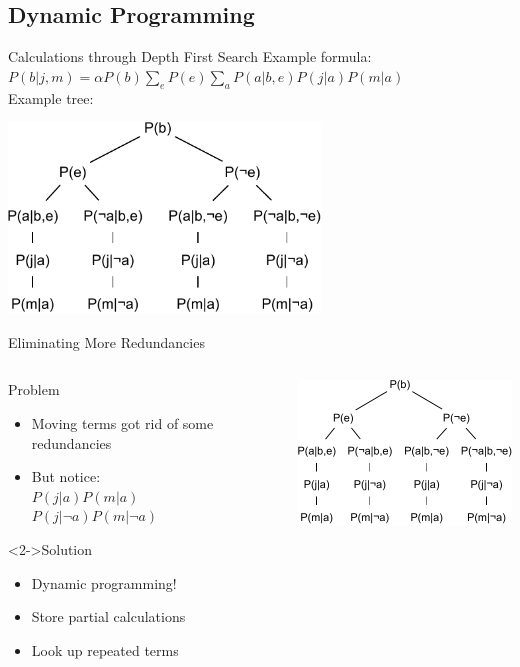 \documentclass[12pt]{beamer}
\newcommand{\tab}{\hspace{1em}}
\begin{document}
\subsection{Dynamic Programming}
\begin{frame}{Calculations through Depth First Search}
	Example formula: \\
	\tab $P(b|j,m) = \alpha P(b)\sum\limits_{e}P(e)\sum\limits_{a}P(a|b,e)P(j|a)P(m|a)$ \\
	\pause
	\bigskip
	Example tree: \\
	\vspace{-2em}
	\begin{center}
		\includegraphics[height=2in]{summation_tree}
	\end{center}
\end{frame}
\begin{frame}{Eliminating More Redundancies}
	\begin{columns}
		\begin{column}{2.2in}
			\begin{block}{Problem}
				\begin{itemize}
					\item Moving terms got rid of some redundancies
					\item But notice: \\
					      $P(j|a)P(m|a)$ \\
					      $P(j|\lnot a)P(m|\lnot a)$
				\end{itemize}
			\end{block}
			\begin{block}<2->{Solution}
				\begin{itemize}
					\item<3-> Dynamic programming!
					\item<4-> Store partial calculations
					\item<4-> Look up repeated terms
				\end{itemize}
			\end{block}
		\end{column}
		\begin{column}{2.4in}
			\includegraphics[width=2.4in]{summation_tree_narrow}
		\end{column}
	\end{columns}
\end{frame}
\end{document}
